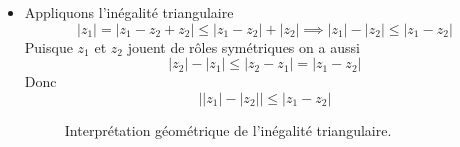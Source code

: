 \documentclass{article}
\renewenvironment{question_kholle}[2][ ]
{
	\subsection{\texorpdfstring{#2}{}}
	\notblank{#1}
	{
		\noindent #1
		\bigbreak
	}
	{}
	\begin{proof}
}
{
	\end{proof}
}
\begin{document}
\begin{question_kholle}
\begin{itemize}[label=$\lozenge$]
    \item Appliquons l'inégalité triangulaire
          $$
            \lvert  z_{1} \rvert  = \lvert z_{1} - z_{2} + z_{2} \rvert  \leqslant \lvert z_{1}-z_{2} \rvert +\lvert z_{2} \rvert  \implies \lvert z_{1} \rvert - \lvert z_{2} \rvert \leqslant \lvert z_{1}-z_{2} \rvert
          $$
          Puisque $z_{1}$ et $z_{2}$ jouent de rôles symétriques on a aussi
          $$
            \lvert z_{2} \rvert - \lvert z_{1} \rvert \leqslant \lvert z_{2}-z_{1} \rvert =\lvert z_{1}-z_{2} \rvert
          $$
          Donc
          $$
            \bigg| \lvert z_{1} \rvert-\lvert z_{2} \rvert \bigg|\leqslant \lvert z_{1}-z_{2} \rvert
          $$
          \begin{figure}[H]
            \centering
            \caption{Interprétation géométrique de l'inégalité triangulaire.}
          \end{figure}
  \end{itemize}

\end{question_kholle}
\end{document}
